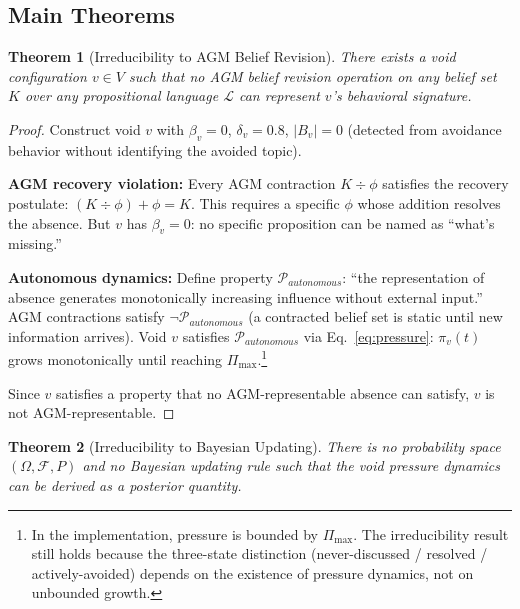 \documentclass[11pt]{article}
\newtheorem{theorem}{Theorem}[section]
\begin{document}
\subsection{Main Theorems}

\begin{theorem}[Irreducibility to AGM Belief Revision]
\label{thm:void-agm}
There exists a void configuration $v \in V$ such that no AGM belief revision operation on any belief set $K$ over any propositional language $\mathcal{L}$ can represent $v$'s behavioral signature.
\end{theorem}

\begin{proof}
Construct void $v$ with $\beta_v = 0$, $\delta_v = 0.8$, $|B_v| = 0$ (detected from avoidance behavior without identifying the avoided topic).

\textbf{AGM recovery violation:} Every AGM contraction $K \div \phi$ satisfies the recovery postulate: $(K \div \phi) + \phi = K$. This requires a specific $\phi$ whose addition resolves the absence. But $v$ has $\beta_v = 0$: no specific proposition can be named as ``what's missing.''

\textbf{Autonomous dynamics:} Define property $\mathcal{P}_{autonomous}$: ``the representation of absence generates monotonically increasing influence without external input.'' AGM contractions satisfy $\neg\mathcal{P}_{autonomous}$ (a contracted belief set is static until new information arrives). Void $v$ satisfies $\mathcal{P}_{autonomous}$ via Eq.~\eqref{eq:pressure}: $\pi_v(t)$ grows monotonically until reaching $\Pi_{\max}$.\footnote{In the implementation, pressure is bounded by $\Pi_{\max}$. The irreducibility result still holds because the three-state distinction (never-discussed / resolved / actively-avoided) depends on the existence of pressure dynamics, not on unbounded growth.}

Since $v$ satisfies a property that no AGM-representable absence can satisfy, $v$ is not AGM-representable.
\end{proof}

\begin{theorem}[Irreducibility to Bayesian Updating]
\label{thm:void-bayes}
There is no probability space $(\Omega, \mathcal{F}, P)$ and no Bayesian updating rule such that the void pressure dynamics can be derived as a posterior quantity.
\end{theorem}
\end{document}
